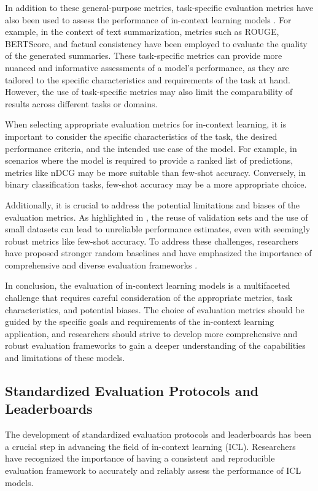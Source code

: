 \documentclass[11pt]{article}
\begin{document}
In addition to these general-purpose metrics, task-specific evaluation metrics have also been used to assess the performance of in-context learning models \cite{ref288}. For example, in the context of text summarization, metrics such as ROUGE, BERTScore, and factual consistency have been employed to evaluate the quality of the generated summaries. These task-specific metrics can provide more nuanced and informative assessments of a model's performance, as they are tailored to the specific characteristics and requirements of the task at hand. However, the use of task-specific metrics may also limit the comparability of results across different tasks or domains.

When selecting appropriate evaluation metrics for in-context learning, it is important to consider the specific characteristics of the task, the desired performance criteria, and the intended use case of the model. For example, in scenarios where the model is required to provide a ranked list of predictions, metrics like nDCG may be more suitable than few-shot accuracy. Conversely, in binary classification tasks, few-shot accuracy may be a more appropriate choice.

Additionally, it is crucial to address the potential limitations and biases of the evaluation metrics. As highlighted in \cite{ref286}, the reuse of validation sets and the use of small datasets can lead to unreliable performance estimates, even with seemingly robust metrics like few-shot accuracy. To address these challenges, researchers have proposed stronger random baselines \cite{ref50} and have emphasized the importance of comprehensive and diverse evaluation frameworks \cite{ref289}.

In conclusion, the evaluation of in-context learning models is a multifaceted challenge that requires careful consideration of the appropriate metrics, task characteristics, and potential biases. The choice of evaluation metrics should be guided by the specific goals and requirements of the in-context learning application, and researchers should strive to develop more comprehensive and robust evaluation frameworks to gain a deeper understanding of the capabilities and limitations of these models.

\subsection{Standardized Evaluation Protocols and Leaderboards}

The development of standardized evaluation protocols and leaderboards has been a crucial step in advancing the field of in-context learning (ICL). Researchers have recognized the importance of having a consistent and reproducible evaluation framework to accurately and reliably assess the performance of ICL models.
\end{document}
